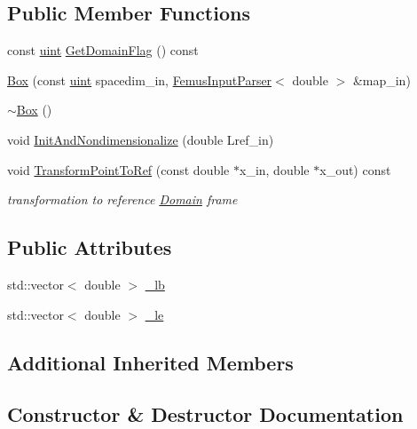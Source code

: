\subsection*{Public Member Functions}
\begin{DoxyCompactItemize}
\item 
const \mbox{\hyperlink{_typedefs_8hpp_a91ad9478d81a7aaf2593e8d9c3d06a14}{uint}} \mbox{\hyperlink{classfemus_1_1_box_ae1e35410fff5545cd0c203cd9ad3001d}{Get\+Domain\+Flag}} () const
\item 
\mbox{\hyperlink{classfemus_1_1_box_ad05d2997adf7230ddd3c8e35c3f34806}{Box}} (const \mbox{\hyperlink{_typedefs_8hpp_a91ad9478d81a7aaf2593e8d9c3d06a14}{uint}} spacedim\+\_\+in, \mbox{\hyperlink{classfemus_1_1_femus_input_parser}{Femus\+Input\+Parser}}$<$ double $>$ \&map\+\_\+in)
\item 
\mbox{\hyperlink{classfemus_1_1_box_ad3446f7195748d6acb6dd9aa8eb6c949}{$\sim$\+Box}} ()
\item 
void \mbox{\hyperlink{classfemus_1_1_box_a68040d6347479ba7a0eb15856c2b96fa}{Init\+And\+Nondimensionalize}} (double Lref\+\_\+in)
\item 
void \mbox{\hyperlink{classfemus_1_1_box_a64a23d5bb0cac88b4e545b121988b3cf}{Transform\+Point\+To\+Ref}} (const double $\ast$x\+\_\+in, double $\ast$x\+\_\+out) const
\begin{DoxyCompactList}\small\item\em transformation to reference \mbox{\hyperlink{classfemus_1_1_domain}{Domain}} frame \end{DoxyCompactList}\end{DoxyCompactItemize}
\subsection*{Public Attributes}
\begin{DoxyCompactItemize}
\item 
std\+::vector$<$ double $>$ \mbox{\hyperlink{classfemus_1_1_box_a443727a5ad255d5352e92c33fac03958}{\+\_\+lb}}
\item 
std\+::vector$<$ double $>$ \mbox{\hyperlink{classfemus_1_1_box_a65fed8de18221ad064d17a440e3f3b04}{\+\_\+le}}
\end{DoxyCompactItemize}
\subsection*{Additional Inherited Members}


\subsection{Constructor \& Destructor Documentation}
\mbox{\label{classfemus_1_1_box_ad05d2997adf7230ddd3c8e35c3f34806}} 
